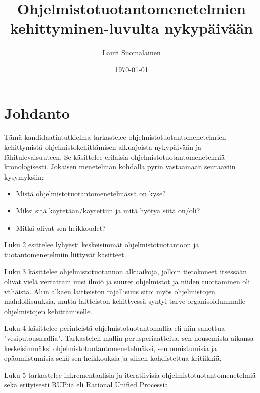 \documentclass[finnish,12pt]{tktltiki2}
\title{Ohjelmistotuotantomenetelmien kehittyminen\newline 1950-luvulta nykypäivään}
\author{Lauri Suomalainen}
\date{\today}
\theoremstyle{definition}
\theoremstyle{remark}
\begin{document}

\frontmatter      %

\maketitle        %
\makeabstract     %

\tableofcontents  %


\mainmatter       %

\section{Johdanto}
\onehalfspacing

Tämä kandidaatintutkielma tarkastelee ohjelmistotuotantomenetelmien kehittymistä ohjelmistokehittämisen alkuajoista nykypäivään ja lähitulevaisuuteen. Se käsittelee erilaisia ohjelmistotuotantomenetelmiä kronologisesti. Jokaisen menetelmän kohdalla pyrin vastaamaan seuraaviin kysymyksiin:

\begin{itemize}
\item Mistä ohjelmistotuotantomenetelmässä on kyse?
\item Miksi sitä käytetään/käytettiin ja mitä hyötyä siitä on/oli?
\item Mitkä olivat sen heikkoudet?
\end{itemize}

Luku 2 esittelee lyhyesti keskeisimmät ohjelmistotuotantoon ja tuotantomenetelmiin liittyvät käsitteet.

Luku 3 käsittelee ohjelmistotuotannon alkuaikoja, jolloin tietokoneet itsessään olivat vielä verrattain uusi ilmiö ja suuret ohjelmistot ja niiden tuottaminen oli vähäistä. Alun alkaen laitteiston rajallisuus sitoi myös ohjelmistojen mahdollisuuksia, mutta laitteiston kehittyessä syntyi tarve organisoidummalle ohjelmistojen kehittämiselle.

Luku 4 käsittelee perinteistä ohjelmistotuotantomallia eli niin sanottua "vesiputousmallia". Tarkastelen mallin perusperiaatteita, sen nousemista aikansa keskeisimmäksi ohjelmistotuotantomenetelmäksi, sen onnistumisia ja epäonnistumisia sekä sen heikkouksia ja siihen kohdistettua kritiikkiä.

Luku 5 tarkastelee inkrementaalisia ja iteratiivisia ohjelmistotuotantomenetelmiä sekä erityisesti RUP:ia eli Rational Unified Processia.
\end{document}
